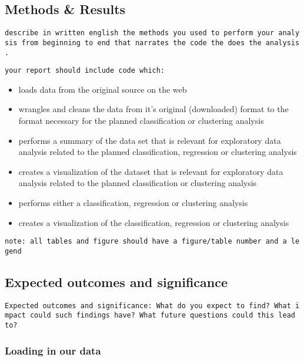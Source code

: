 \documentclass[11pt]{article}
\providecommand{\tightlist}{%
      \setlength{\itemsep}{0pt}\setlength{\parskip}{0pt}}
\begin{document}
    

    \hypertarget{methods-results}{%
\subsection{Methods \& Results}\label{methods-results}}

\texttt{describe\ in\ written\ english\ the\ methods\ you\ used\ to\ perform\ your\ analysis\ from\ beginning\ to\ end\ that\ narrates\ the\ code\ the\ does\ the\ analysis.}

\texttt{your\ report\ should\ include\ code\ which:}

\begin{itemize}
\tightlist
\item
  loads data from the original source on the web
\item
  wrangles and cleans the data from it's original (downloaded) format to
  the format necessary for the planned classification or clustering
  analysis
\item
  performs a summary of the data set that is relevant for exploratory
  data analysis related to the planned classification, regression or
  clustering analysis
\item
  creates a visualization of the dataset that is relevant for
  exploratory data analysis related to the planned classification or
  clustering analysis
\item
  performs either a classification, regression or clustering analysis
\item
  creates a visualization of the classification, regression or
  clustering analysis
\end{itemize}

\texttt{note:\ all\ tables\ and\ figure\ should\ have\ a\ figure/table\ number\ and\ a\ legend}

    \hypertarget{expected-outcomes-and-significance}{%
\subsection{Expected outcomes and
significance}\label{expected-outcomes-and-significance}}

\texttt{Expected\ outcomes\ and\ significance:\ What\ do\ you\ expect\ to\ find?\ What\ impact\ could\ such\ findings\ have?\ What\ future\ questions\ could\ this\ lead\ to?}

    \hypertarget{loading-in-our-data}{%
\subsubsection{Loading in our data}\label{loading-in-our-data}}
\end{document}
